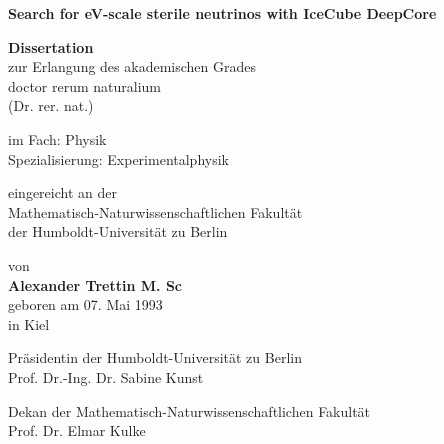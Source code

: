 \documentclass[
a4paper, %
fontsize=10pt, %
twoside=true, %
numbers=noenddot, %
]{kaobook}
\begin{document}
\begin{titlepage}
	\begin{center}
	\vspace*{1cm}
	
	\LARGE
	\textbf{Search for eV-scale sterile neutrinos with IceCube DeepCore}
	\large
	
	\vspace{0.8cm}
	
	\textbf{Dissertation}\\
	zur Erlangung des akademischen Grades\\
	doctor rerum naturalium \\ 
	(Dr. rer. nat.) \\
	
	\vspace{0.5cm}
	
	im Fach: Physik \\
	Spezialisierung: Experimentalphysik\\
	
	\vspace{0.5cm}
	
	eingereicht an der \\
	Mathematisch-Naturwissenschaftlichen Fakultät\\	
	der Humboldt-Universität zu Berlin\\
	
	\vspace{0.5cm}
	
	von\\
	\textbf{Alexander Trettin M. Sc}\\
	geboren am 07. Mai 1993\\
	in Kiel
	
	\vspace{0.5cm}
	
	Präsidentin der Humboldt-Universität zu Berlin\\
	Prof. Dr.-Ing. Dr. Sabine Kunst\\
	 
	\vspace{0.5cm}
	 
	Dekan der Mathematisch-Naturwissenschaftlichen Fakultät\\
	Prof. Dr. Elmar Kulke\\
	

\end{center}
\end{titlepage}
\end{document}
